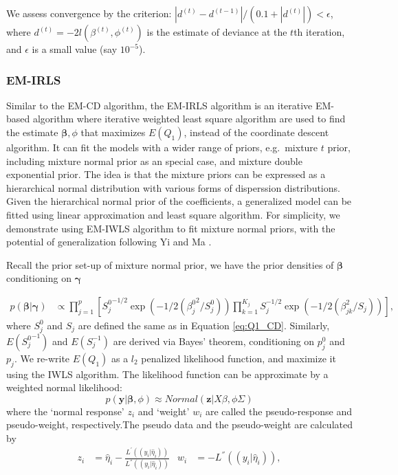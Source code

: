 \documentclass[AMA,STIX1COL,]{WileyNJD-v2}
\begin{document}
We assess convergence by the criterion:
\(|d^{(t)}-d^{(t-1)}|/(0.1+|d^{(t)}|)<\epsilon\), where
\(d^{(t)} = -2l(\beta^{(t)},\phi^{(t)})\) is the estimate of deviance at
the \(t\)th iteration, and \(\epsilon\) is a small value (say
\(10^{-5}\)).

\hypertarget{em-irls}{%
\subsubsection{EM-IRLS}\label{em-irls}}

Similar to the EM-CD algorithm, the EM-IRLS algorithm is an iterative
EM-based algorithm where iterative weighted least square algorithm are
used to find the estimate \(\boldsymbol{\beta}, \phi\) that maximizes
\(E(Q_1)\), instead of the coordinate descent algorithm. It can fit the
models with a wider range of priors, e.g.~mixture \(t\) prior, including
mixture normal prior as an special case, and mixture double exponential
prior. The idea is that the mixture priors can be expressed as a
hierarchical normal distribution with various forms of disperssion
distributions. \citep{Yi2012} Given the hierarchical normal prior of the
coefficients, a generalized model can be fitted using linear
approximation and least square algorithm. For simplicity, we demonstrate
using EM-IWLS algorithm to fit mixture normal priors, with the potential
of generalization following Yi and Ma \citep{Yi2012}.

Recall the prior set-up of mixture normal prior, we have the prior
densities of \(\boldsymbol{\beta}\) conditioning on
\(\boldsymbol{\gamma}\)

\[
\begin{aligned}
p(\boldsymbol{\beta }| \boldsymbol{\gamma}) &\propto \prod\limits_{j=1}^{p}\left[{S^0_j}^{-1/2}\exp(-1/2({\beta^0_{j}}^2/S^0_{j}))\prod\limits_{k=1}^{K_j}S_{j}^{-1/2}\exp(-1/2(\beta_{jk}^2/S_{j}))\right],
\end{aligned}
\] where \(S_{j}^0\) and \(S_{j}\) are defined the same as in Equation
\ref{eq:Q1_CD}. Similarly, \(E({S_j^0}^{-1})\) and \(E(S^{-1}_j)\) are
derived via Bayes' theorem, conditioning on \(p^0_j\) and \(p_j\). We
re-write \(E(Q_1)\) as a \(l_2\) penalized likelihood function, and
maximize it using the IWLS algorithm. The likelihood function can be
approximate by a weighted normal likelihood: \[
  p(\textbf{y}|\boldsymbol{\beta}, \phi) \approx Normal(\textbf{z}|X\beta, \phi\Sigma)
\] where the `normal response' \(z_i\) and `weight' \(w_i\) are called
the pseudo-response and pseudo-weight, respectively.The pseudo data and
the pseudo-weight are calculated by \[
\begin{aligned}
z_i &= \hat\eta_i - \frac{L^{'}((y_i|\hat\eta_i))}{L^{''}((y_i|\hat\eta_i))}& w_i &= - L^{''}((y_i|\hat\eta_i)),
\end{aligned}
\]
\end{document}
